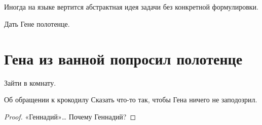 \documentclass[a4paper,12pt]{article}
\begin{document}

\section{}

Иногда на языке вертится абстрактная идея задачи без конкретной формулировки.

\begin{problembox}
  Дать Гене полотенце.
\end{problembox}

\renewcommand{\sectionkeyword}{Сюжет}  %
\section{Гена из ванной попросил полотенце}

\begin{problem}{}
  Зайти в комнату.
\end{problem}

\begin{problem}{Об обращении к крокодилу}
  Сказать что-то так, чтобы Гена ничего не заподозрил.
\end{problem}

\begin{proof}
  «Геннадий»… Почему Геннадий?
\end{proof}
\end{document}
